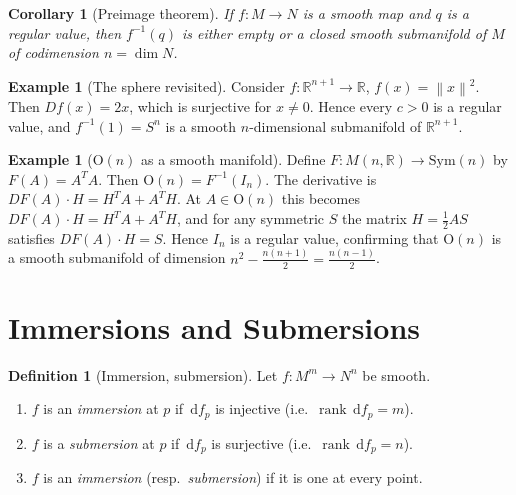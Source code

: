 \documentclass[12pt,a4paper,openany]{book}
\newtheorem{corollary}[theorem]{Corollary}
\theoremstyle{definition}
\newtheorem{definition}[theorem]{Definition}
\newtheorem{example}[theorem]{Example}
\theoremstyle{remark}
\newcommand{\R}{\mathbb{R}}
\newcommand{\Orth}{\mathrm{O}}
\newcommand{\dd}{\,\mathrm{d}}
\newcommand{\norm}[1]{\left\lVert #1 \right\rVert}
\DeclareMathOperator{\rank}{rank}
\begin{document}
\begin{corollary}[Preimage theorem]\label{cor:preimage}
If $f \colon M \to N$ is a smooth map and $q$ is a regular value, then
$f^{-1}(q)$ is either empty or a closed smooth submanifold of $M$ of
codimension $n = \dim N$.
\end{corollary}

\begin{example}[The sphere revisited]\label{ex:sphere-preimage}
Consider $f \colon \R^{n+1} \to \R$, $f(x) = \norm{x}^2$.  Then
$Df(x) = 2x$, which is surjective for $x \neq 0$.  Hence every $c > 0$ is a
regular value, and $f^{-1}(1) = S^n$ is a smooth $n$-dimensional
submanifold of $\R^{n+1}$.
\end{example}

\begin{example}[$\Orth(n)$ as a smooth manifold]\label{ex:On-preimage}
Define $F \colon M(n,\R) \to \mathrm{Sym}(n)$ by $F(A) = A^T A$.  Then
$\Orth(n) = F^{-1}(I_n)$.  The derivative is
$DF(A) \cdot H = H^T A + A^T H$.  At $A \in \Orth(n)$ this becomes
$DF(A) \cdot H = H^T A + A^T H$, and for any symmetric $S$ the matrix
$H = \tfrac{1}{2}AS$ satisfies $DF(A) \cdot H = S$.  Hence $I_n$ is a
regular value, confirming that $\Orth(n)$ is a smooth submanifold of
dimension $n^2 - \tfrac{n(n+1)}{2} = \tfrac{n(n-1)}{2}$.
\end{example}

\section{Immersions and Submersions}
\label{sec:immersions-submersions}

\begin{definition}[Immersion, submersion]\label{def:immersion-submersion}
Let $f \colon M^m \to N^n$ be smooth.
\begin{enumerate}[label=(\roman*)]
  \item $f$ is an \emph{immersion} at $p$ if $\dd f_p$ is injective
        (i.e.\ $\rank \dd f_p = m$).
  \item $f$ is a \emph{submersion} at $p$ if $\dd f_p$ is surjective
        (i.e.\ $\rank \dd f_p = n$).
  \item $f$ is an \emph{immersion} (resp.\ \emph{submersion}) if it is one
        at every point.
\end{enumerate}
\end{definition}
\end{document}
